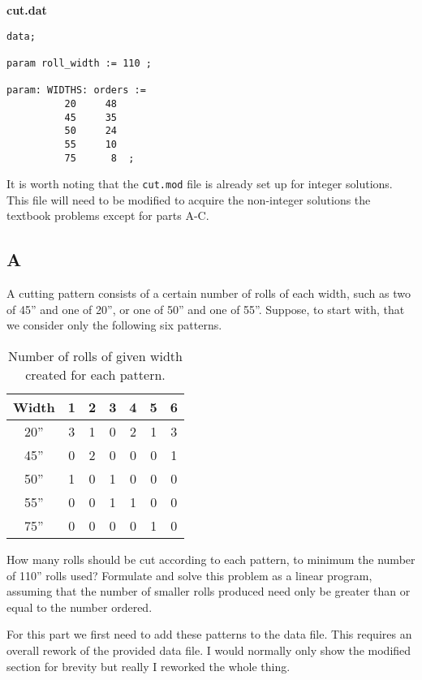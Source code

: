 \noindent\textbf{cut.dat}

\begin{lstlisting}
data;

param roll_width := 110 ;

param: WIDTHS: orders :=
          20     48
          45     35
          50     24
          55     10
          75      8  ;
\end{lstlisting}

It is worth noting that the \texttt{cut.mod} file is already set up for integer solutions. This file will need to be modified to acquire the non-integer solutions the textbook problems except for parts A-C. 

\subsection*{A}

\prob

A cutting pattern consists of a certain number of rolls of each width, such as two of 45'' and one of 20'', or one of 50'' and one of 55''. Suppose, to start with, that we consider only the following six patterns.

\begin{table}[!h]
	\centering
	\begin{tabular}{|c|cccccc|}
		\hline
		Width & 1 & 2 & 3 & 4 & 5 & 6 \\
		\hline
		20'' & 3 & 1 & 0 & 2 & 1 & 3 \\
		45'' & 0 & 2 & 0 & 0 & 0 & 1 \\
		50'' & 1 & 0 & 1 & 0 & 0 & 0 \\
		55'' & 0 & 0 & 1 & 1 & 0 & 0 \\
		75'' & 0 & 0 & 0 & 0 & 1 & 0 \\
		\hline
	\end{tabular}
	\caption{Number of rolls of given width created for each pattern.}
\end{table}

How many rolls should be cut according to each pattern, to minimum the number of 110'' rolls used? Formulate and solve this problem as a linear program, assuming that the number of smaller rolls produced need only be greater than or equal to the number ordered.

\sol

For this part we first need to add these patterns to the data file. This requires an overall rework of the provided data file. I would normally only show the modified section for brevity but really I reworked the whole thing.


